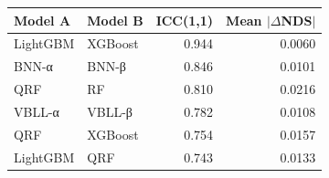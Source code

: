 \begin{tabular}{llrr}
\toprule
\textbf{Model A} & \textbf{Model B} & \textbf{ICC(1,1)} & \textbf{Mean $|\Delta$NDS$|$} \\
\midrule
LightGBM & XGBoost & 0.944 & 0.0060 \\
BNN-α & BNN-β & 0.846 & 0.0101 \\
QRF & RF & 0.810 & 0.0216 \\
VBLL-α & VBLL-β & 0.782 & 0.0108 \\
QRF & XGBoost & 0.754 & 0.0157 \\
LightGBM & QRF & 0.743 & 0.0133 \\
\bottomrule
\end{tabular}